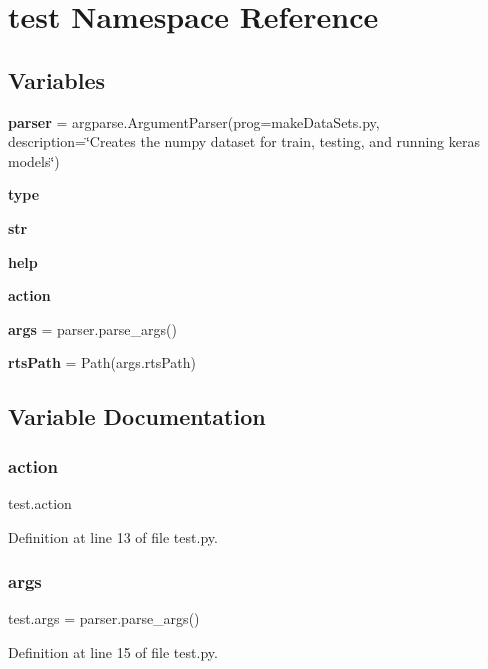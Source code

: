 \section{test Namespace Reference}
\label{namespacetest}
\subsection*{Variables}
\begin{DoxyCompactItemize}
\item 
\textbf{ parser} = argparse.\+Argument\+Parser(prog=\textquotesingle{}make\+Data\+Sets.\+py\textquotesingle{}, description=\char`\"{}Creates the numpy dataset for train, testing, and running keras models\char`\"{})
\item 
\textbf{ type}
\item 
\textbf{ str}
\item 
\textbf{ help}
\item 
\textbf{ action}
\item 
\textbf{ args} = parser.\+parse\+\_\+args()
\item 
\textbf{ rts\+Path} = Path(args.\+rts\+Path)
\end{DoxyCompactItemize}


\subsection{Variable Documentation}
\mbox{\label{namespacetest_afd7cbaa24b9a76b11854a2d239deb753}} 
\subsubsection{action}
{\footnotesize\ttfamily test.\+action}



Definition at line 13 of file test.\+py.

\mbox{\label{namespacetest_a83037eb0720ea16e6653fa2a016b3eba}} 
\subsubsection{args}
{\footnotesize\ttfamily test.\+args = parser.\+parse\+\_\+args()}



Definition at line 15 of file test.\+py.

\mbox{\label{namespacetest_ae07aa539fc28078762bd459af906f5e0}} 
